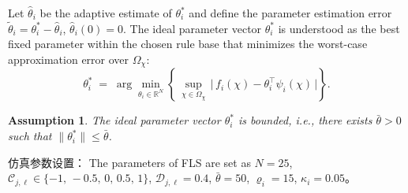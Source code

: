 \documentclass[pdflatex,sn-mathphys-num]{sn-jnl}%
\theoremstyle{thmstyleone}%
\newtheorem{assumption}{Assumption}
\theoremstyle{thmstyletwo}%
\theoremstyle{thmstylethree}%
\begin{document}
\par Let $\hat\theta_i$ be the adaptive estimate of $\theta_i^*$ and define the parameter estimation error $\tilde\theta_i=\theta_i^*-\hat\theta_i$, $\hat\theta_i(0)= 0$. The ideal parameter vector $\theta_i^*$ is understood as the best fixed parameter within the chosen rule base that minimizes the worst-case approximation error over $\Omega_\chi$:
\begin{equation}
    \theta_i^* \;=\; \arg\min_{\theta_i\in\mathbb{R}^N}
    \left\{\,\sup_{\chi\in\Omega_\chi}\, \big|\, f_i(\chi)-\theta_i^\top \psi_i(\chi)\,\big| \right\}.
    \label{eq:6}
\end{equation}

\begin{assumption}\label{assumption:3}
The ideal parameter vector $\theta_i^*$ is bounded, i.e., there exists $\bar\theta>0$ such that $\|\theta_i^*\|\le \bar\theta$.
\end{assumption}


仿真参数设置：
The parameters of FLS are set as $N=25$, $\mathcal C_{j,\ell}\in\{-1,\,-0.5,\,0,\,0.5,\,1\}$, $\mathcal D_{j,\ell}=0.4$, $\bar\theta=50$, $\varrho_i=15$, $\kappa_i=0.05$。




\end{document}
